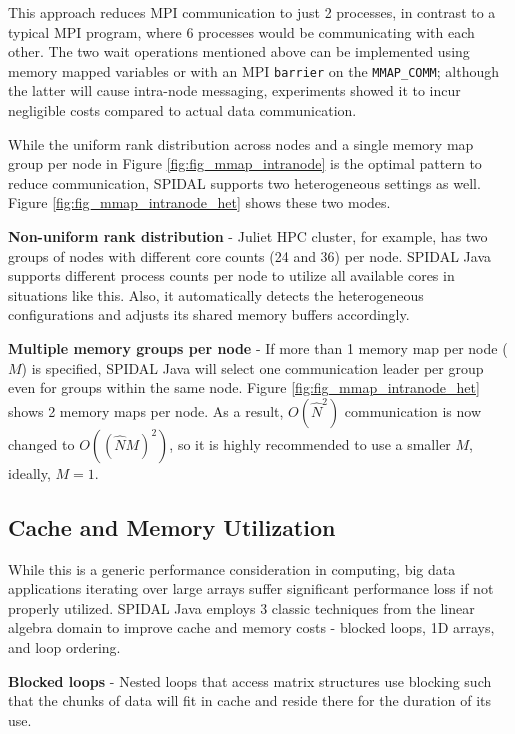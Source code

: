 This approach reduces MPI communication to just 2 processes, in contrast to a typical MPI program, where 6 processes would be communicating with each other. The two wait operations mentioned above can be implemented using memory mapped variables or with an MPI \texttt{barrier} on the \texttt{MMAP\_COMM}; although the latter will cause intra-node messaging, experiments showed it to incur negligible costs compared to actual data communication.


While the uniform rank distribution across nodes and a single memory map group per node in Figure \ref{fig:fig_mmap_intranode} is the optimal pattern to reduce communication, SPIDAL supports two heterogeneous settings as well. Figure \ref{fig:fig_mmap_intranode_het} shows these two modes.

\textbf{Non-uniform rank distribution} - Juliet HPC cluster, for example, has two groups of nodes with different core counts (24 and 36) per node. SPIDAL Java supports different process counts per node to utilize all available cores in situations like this. Also, it automatically detects the heterogeneous configurations and adjusts its shared memory buffers accordingly.

\textbf{Multiple memory groups per node} - If more than 1 memory map per node ($M$) is specified, SPIDAL Java will select one communication leader per group even for groups within the same node. Figure \ref{fig:fig_mmap_intranode_het} shows 2 memory maps per node. As a result, $O(\hat{N}^2)$ communication is now changed to $O((\hat{N}M)^2)$, so it is highly recommended to use a smaller $M$, ideally, $M=1$.


\subsection{Cache and Memory Utilization}
While this is a generic performance consideration in computing, big data applications iterating over large arrays suffer significant performance loss if not properly utilized. SPIDAL Java employs 3 classic techniques from the linear algebra domain to improve cache and memory costs  - blocked loops, 1D arrays, and loop ordering. 

\textbf{Blocked loops} - Nested loops that access matrix structures use blocking such that the chunks of data will fit in cache and reside there for the duration of its use. 

